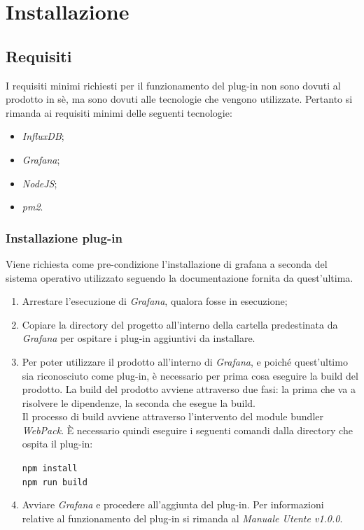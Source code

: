 \section{Installazione}\label{Installazione}

\subsection{Requisiti}\label{Requisiti}
I requisiti minimi richiesti per il funzionamento del plug-in non sono dovuti al prodotto in sè, ma sono dovuti alle tecnologie che vengono utilizzate. Pertanto si rimanda ai requisiti minimi delle seguenti tecnologie:
\begin{itemize}
	\item \textit{InfluxDB};
	\item \textit{Grafana};
	\item \textit{NodeJS}; 
	\item \textit{pm2}. 
\end{itemize}

\subsubsection{Installazione plug-in}
Viene richiesta come pre-condizione l'installazione di grafana a seconda del sistema operativo utilizzato seguendo la documentazione fornita da quest'ultima. 
\begin{enumerate}
	\item Arrestare l'esecuzione di \textit{Grafana}, qualora fosse in esecuzione;	
	\item Copiare la directory del progetto all'interno della cartella predestinata da \textit{Grafana} per ospitare i plug-in aggiuntivi da installare.
	\item Per poter utilizzare il prodotto all'interno di \textit{Grafana}, e poiché quest'ultimo sia riconosciuto come plug-in, è necessario per prima cosa eseguire la build del prodotto.
	La build del prodotto avviene attraverso due fasi: la prima che va a risolvere le dipendenze, la seconda che esegue la build.\\
	Il processo di build avviene attraverso l'intervento del module bundler \textit{WebPack}.
	È necessario quindi eseguire i seguenti comandi dalla directory che ospita il plug-in:
\begin{center}
	\texttt{npm install}\\
	\texttt{npm run build}
\end{center}
\item Avviare \textit{Grafana} e procedere all'aggiunta del plug-in.
Per informazioni relative al funzionamento del plug-in si rimanda al \textit{Manuale Utente v1.0.0}.
\end{enumerate}


